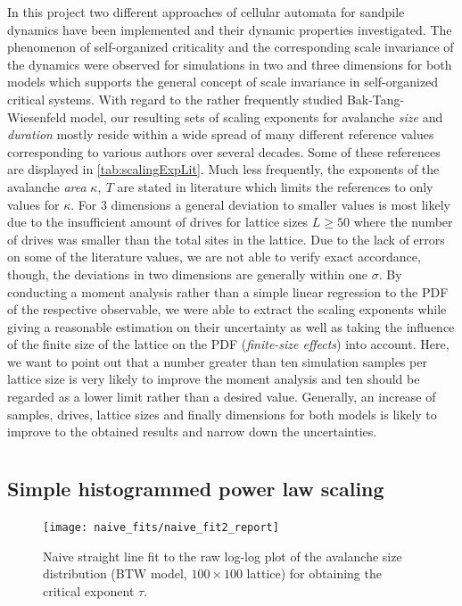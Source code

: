 In this project two different approaches of cellular automata for sandpile dynamics have been implemented and their
dynamic properties investigated. The phenomenon of self-organized criticality and the corresponding scale invariance
of the dynamics were observed for simulations in two and three dimensions for both models which supports the general
concept of scale invariance in self-organized critical systems. With regard to the rather frequently studied
Bak-Tang-Wiesenfeld model, our resulting sets of scaling exponents for avalanche \textit{size} and \textit{duration}
mostly reside within a wide spread of many different reference values corresponding to various authors over several
decades. Some of these references are displayed in \ref{tab:scalingExpLit}. Much less frequently, the exponents of the
avalanche \textit{area} $\kappa,\ T$ are stated in literature which limits the references to only values for $\kappa$.
For 3 dimensions a general deviation to smaller values is most likely due to the insufficient amount of drives for
lattice sizes $L\ge 50$ where the number of drives was smaller than the total sites in the lattice.
Due to the lack of errors on some of the literature values, we are not able to verify exact accordance, though,
the deviations in two dimensions are generally within one $\sigma$. By conducting a moment analysis rather than a
simple linear regression to the PDF of the respective observable, we were able to extract the scaling exponents while
giving a reasonable estimation on their uncertainty as well as taking the influence of the finite size of the lattice
on the PDF (\textit{finite-size effects}) into account. Here, we want to point out that a number greater than ten
simulation samples per lattice size is very likely to improve the moment analysis and ten should be regarded as a lower
limit rather than a desired value. Generally, an increase of samples, drives, lattice sizes and finally dimensions for
both models is likely to improve to the obtained results and narrow down the uncertainties.


\appendix*

\section{}
\label{sec:app}

\subsection{Simple histogrammed power law scaling}
\label{app:naiveFit}
\begin{figure}[!h]
    \centering
    \texttt{[image: naive\_fits/naive\_fit2\_report]}
    \caption{Naive straight line fit to the raw log-log plot of the avalanche size distribution
             (BTW model, $100\times 100$ lattice) for obtaining the critical exponent $\tau$.}
    \label{fig:naiveFit}
\end{figure}

